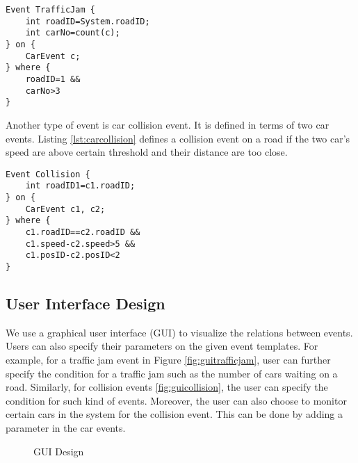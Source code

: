 \begin{lstlisting}[caption=Traffic jam event, label=lst:trafficjam]
Event TrafficJam {
	int roadID=System.roadID;
	int carNo=count(c);
} on {
	CarEvent c;
} where {
	roadID=1 &&
	carNo>3
}
\end{lstlisting}

Another type of event is car collision event. It is defined in terms of two car events. Listing \ref{lst:carcollision} defines a collision event on a road if the two car's speed are above certain threshold and their distance are too close.
\begin{lstlisting}[caption=Car collision event, label=lst:carcollision]
Event Collision {
	int roadID1=c1.roadID;
} on {
	CarEvent c1, c2;
} where {
	c1.roadID==c2.roadID &&
	c1.speed-c2.speed>5 && 
	c1.posID-c2.posID<2 
}
\end{lstlisting}

\subsection{User Interface Design}
We use a graphical user interface (GUI) to visualize the relations between events. Users can also specify their parameters on the given event templates. For example, for a traffic jam event in Figure \ref{fig:guitrafficjam}, user can further specify the condition for a traffic jam such as the number of cars waiting on a road. Similarly, for collision events \ref{fig:guicollision}, the user can specify the condition for such kind of events. Moreover, the user can also choose to monitor certain cars in the system for the collision event. This can be done by adding a parameter in the car events.

\begin{figure}
\centering
{}
\caption{GUI Design}
\label{fig:gui}
\end{figure}

